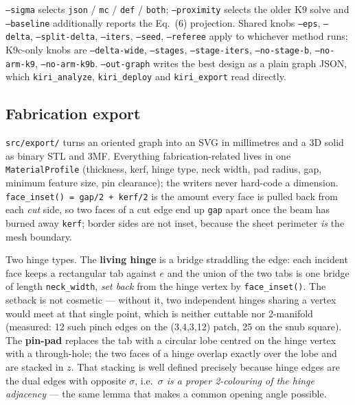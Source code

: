 \documentclass[11pt,a4paper]{article}
\theoremstyle{definition}
\newcommand{\file}[1]{\texttt{\small #1}}
\begin{document}
\noindent \file{--sigma} selects \texttt{json} / \texttt{mc} / \texttt{def} / \texttt{both};
\file{--proximity} selects the older K9 solve and \file{--baseline} additionally reports the
Eq.~(6) projection. Shared knobs \file{--eps}, \file{--delta}, \file{--split-delta},
\file{--iters}, \file{--seed}, \file{--referee} apply to whichever method runs; K9c-only knobs
are \file{--delta-wide}, \file{--stages}, \file{--stage-iters}, \file{--no-stage-b},
\file{--no-arm-k9}, \file{--no-arm-k9b}. \file{--out-graph} writes the best design as a plain
graph JSON, which \file{kiri\_analyze}, \file{kiri\_deploy} and \file{kiri\_export} read
directly.

\subsection{Fabrication export}

\file{src/export/} turns an oriented graph into an SVG in millimetres and a 3D solid as binary
STL and 3MF. Everything fabrication-related lives in one \texttt{MaterialProfile} (thickness,
kerf, hinge type, neck width, pad radius, gap, minimum feature size, pin clearance); the
writers never hard-code a dimension. \texttt{face\_inset() = gap/2 + kerf/2} is the amount
every face is pulled back from each \emph{cut} side, so two faces of a cut edge end up
\texttt{gap} apart once the beam has burned away \texttt{kerf}; border sides are not inset,
because the sheet perimeter \emph{is} the mesh boundary.

Two hinge types. The \textbf{living hinge} is a bridge straddling the edge: each incident face
keeps a rectangular tab against $e$ and the union of the two tabs is one bridge of length
\texttt{neck\_width}, \emph{set back} from the hinge vertex by \texttt{face\_inset()}. The
setback is not cosmetic --- without it, two independent hinges sharing a vertex would meet at
that single point, which is neither cuttable nor 2-manifold (measured: 12 such pinch edges on
the (3,4,3,12) patch, 25 on the snub square). The \textbf{pin-pad} replaces the tab with a
circular lobe centred on the hinge vertex with a through-hole; the two faces of a hinge
overlap exactly over the lobe and are stacked in $z$. That stacking is well defined precisely
because hinge edges are the dual edges with opposite $\sigma$, i.e.\ \emph{$\sigma$ is a proper
2-colouring of the hinge adjacency} --- the same lemma that makes a common opening angle
possible.
\end{document}
